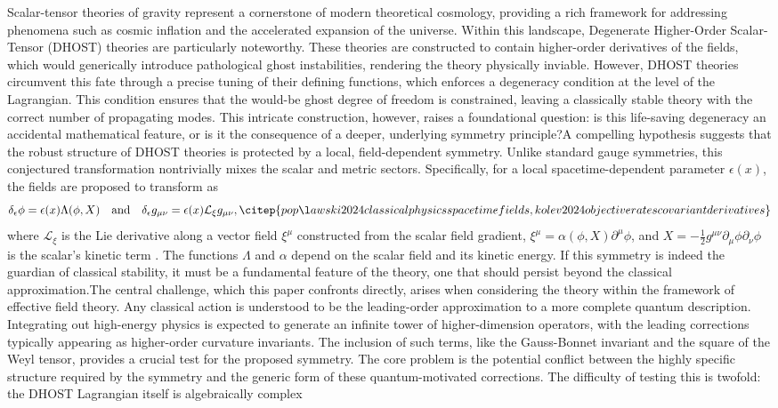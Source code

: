 \documentclass[twocolumn]{aastex631}
\begin{document}
Scalar-tensor theories of gravity represent a cornerstone of modern theoretical cosmology, providing a rich framework for addressing phenomena such as cosmic inflation and the accelerated expansion of the universe. Within this landscape, Degenerate Higher-Order Scalar-Tensor (DHOST) theories are particularly noteworthy. These theories are constructed to contain higher-order derivatives of the fields, which would generically introduce pathological ghost instabilities, rendering the theory physically inviable. However, DHOST theories circumvent this fate through a precise tuning of their defining functions, which enforces a degeneracy condition at the level of the Lagrangian. This condition ensures that the would-be ghost degree of freedom is constrained, leaving a classically stable theory with the correct number of propagating modes. This intricate construction, however, raises a foundational question: is this life-saving degeneracy an accidental mathematical feature, or is it the consequence of a deeper, underlying symmetry principle?A compelling hypothesis suggests that the robust structure of DHOST theories is protected by a local, field-dependent symmetry. Unlike standard gauge symmetries, this conjectured transformation nontrivially mixes the scalar and metric sectors. Specifically, for a local spacetime-dependent parameter $\epsilon(x)$, the fields are proposed to transform as\begin{equation}\delta_\epsilon \phi = \epsilon(x) \Lambda(\phi, X) \quad \text{and} \quad \delta_\epsilon g_{\mu\nu} = \epsilon(x) \mathcal{L}_{\xi} g_{\mu\nu}, \citep{popławski2024classicalphysicsspacetimefields,kolev2024objectiveratescovariantderivatives}\end{equation}where $\mathcal{L}_{\xi}$ is the Lie derivative along a vector field $\xi^\mu$ constructed from the scalar field gradient, $\xi^\mu = \alpha(\phi, X)\partial^\mu\phi$, and $X = -\frac{1}{2}g^{\mu\nu}\partial_\mu\phi\partial_\nu\phi$ is the scalar's kinetic term  \citep{gao2019higherderivativescalartensortheory,apostolopoulos2023constructingfamilyconformallyflat}. The functions $\Lambda$ and $\alpha$ depend on the scalar field and its kinetic energy. If this symmetry is indeed the guardian of classical stability, it must be a fundamental feature of the theory, one that should persist beyond the classical approximation.The central challenge, which this paper confronts directly, arises when considering the theory within the framework of effective field theory. Any classical action is understood to be the leading-order approximation to a more complete quantum description. Integrating out high-energy physics is expected to generate an infinite tower of higher-dimension operators, with the leading corrections typically appearing as higher-order curvature invariants. The inclusion of such terms, like the Gauss-Bonnet invariant and the square of the Weyl tensor, provides a crucial test for the proposed symmetry. The core problem is the potential conflict between the highly specific structure required by the symmetry and the generic form of these quantum-motivated corrections. The difficulty of testing this is twofold: the DHOST Lagrangian itself is algebraically complex 
\end{document}
